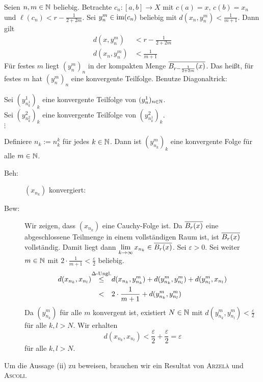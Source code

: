 \begin{beweis}[zu (i)]
		Seien $n,m \in \mathbb{N}$ beliebig.
		Betrachte $c_n\colon [a,b] \rightarrow X$ mit $c(a) = x$, $c(b) = x_n$ und $\ell(c_n) < r - \frac{1}{2+2m}$. Sei $y_n^m \in \operatorname{im}(c_n)$ beliebig mit $d(x_n,y_n^m) < \frac{1}{m+1}$. Dann gilt
		\begin{align*}
			d(x,y_n^m) &< r - \frac{1}{2+2m} \\
			d(x_n,y_n^m) &< \frac{1}{m+1}
		\end{align*}
		Für festes $m$ liegt $(y_n^m)_n$ in der kompakten Menge $\overline{B_{r-\frac{1}{2+2m}}(x)}$.
		Das heißt, für festes $m$ hat $(y_n^m)_n$ eine konvergente Teilfolge. Benutze Diagonaltrick:
		\begin{center}
			Sei $(y_{n^1_k}^1)_k$ eine konvergente Teilfolge von $(y_n^1)_{n \in \mathbb{N}}$. \\
			Sei $(y_{n^2_k}^2)_k$ eine konvergente Teilfolge von $(y_{n^1_k}^2)_k$. \\
			$\vdots$
		\end{center}
		Definiere $n_k := n_k^k$ für jedes $k \in \mathbb{N}$.
		Dann ist $(y_{n_k}^m)_k$ eine konvergente Folge für alle $m \in \mathbb{N}$.
		\begin{description}
			\item[Beh:]  $(x_{n_k})$ konvergiert:
			\item[Bew:] Wir zeigen, dass $(x_{n_k})$ eine Cauchy-Folge ist.
			Da $\overline{B_r(x)}$ eine abgeschlossene Teilmenge in einem vollständigen Raum ist, ist $\overline{B_r(x)}$ vollständig.
			Damit liegt dann $\lim\limits_{k \rightarrow \infty} x_{n_k} \in \overline{B_r(x)}$.
			Sei $\varepsilon > 0$.
			Sei weiter $m \in \mathbb{N}$ mit $2 \cdot \frac{1}{m+1} < \frac{\varepsilon}{2}$ beliebig.
			\begin{align*}
				d(x_{n_k},x_{n_l}) &\stack{\Delta\text{-Ungl.}}{\leq} d(x_{n_k},y_{n_k}^m) + d(y_{n_k}^m,y_{n_l}^m) + d(y_{n_l}^m,x_{n_l}) \\
				&\stack{}{<} 2 \cdot \frac{1}{m+1} + d(y_{n_k}^m, y_{n_l}^m)
			\end{align*}
			Da $(y_{n_k}^m)$ für alle $m$ konvergent ist, existiert $N \in \mathbb{N}$ mit $d(y_{n_k}^m,y_{n_l}^m) < \frac{\varepsilon}{2}$ für alle $k,l > N$. Wir erhalten
			\[
				d(x_{n_k},x_{n_l}) < \frac{\varepsilon}{2} + \frac{\varepsilon}{2} = \varepsilon
			\]
			für alle $k,l > N$. \qedhere
		\end{description}
\end{beweis}

Um die Aussage (ii) zu beweisen, brauchen wir ein Resultat von \textsc{Arzelà} und \textsc{Ascoli}. 

